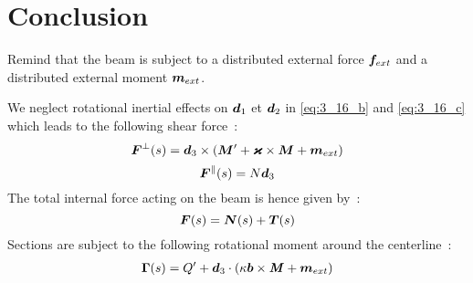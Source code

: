 \clearpage

\section{Conclusion}
Remind that the beam is subject to a distributed external force $\boldsymbol{f}_{ext}$ and a distributed external moment $\boldsymbol{m}_{ext}$.

We neglect rotational inertial effects on $\boldsymbol{d}_1$ et $\boldsymbol{d}_2$ in \eqref{eq:3_16_b} and \eqref{eq:3_16_c} which leads to the following shear force~:
\begin{equation}
	\boldsymbol{F}^{\perp}(s) = \boldsymbol{d}_3 \times (\boldsymbol{M}' + \boldsymbol{\varkappa} \times \boldsymbol{M} + \boldsymbol{m}_{ext})
\end{equation}
\begin{equation}
	\boldsymbol{F}^{\parallel}(s) = N \boldsymbol{d}_3
\end{equation}
 The total internal force acting on the beam is hence given by~:
\begin{equation}
	\boldsymbol{F}(s) = \boldsymbol{N}(s) + \boldsymbol{T}(s)
\end{equation}
Sections are subject to the following rotational moment around the centerline~:
\begin{equation}
	\begin{aligned}
	\boldsymbol{\Gamma}(s) = Q' + \boldsymbol{d}_3 \cdot ( \kappa\boldsymbol{b} \times \boldsymbol{\mathit{M}} + \boldsymbol{m}_{ext})
	\end{aligned}
\end{equation}

